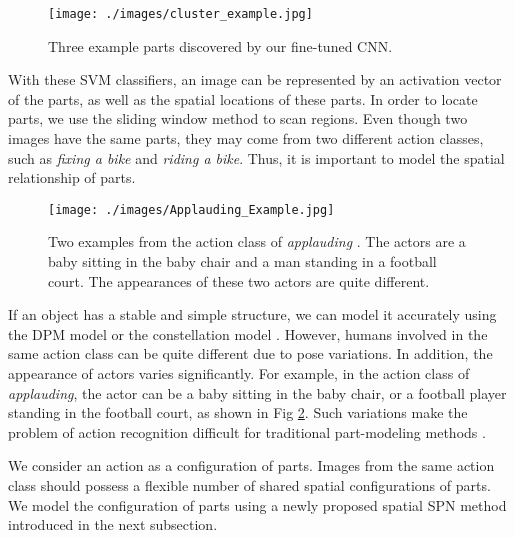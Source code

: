 \documentclass[journal]{IEEEtran}
\begin{document}
\begin{figure}[t]
	\begin{center}
		\texttt{[image: ./images/cluster\_example.jpg]}
	\end{center}
	\caption{Three example parts discovered by our fine-tuned CNN. }
	\label{fig:clusterExample}
\end{figure}


With these SVM classifiers, an image can be represented by an activation vector of the parts, as well as the spatial locations of these parts. In order to locate parts, we use the sliding window method to scan regions. Even though two images have the same parts, they may come from two different action classes,  such as \textit{fixing a bike} and \textit{riding a bike}. Thus, it is important to model the spatial relationship of parts.


\begin{figure}[htb]
	\begin{center}
		\texttt{[image: ./images/Applauding\_Example.jpg]}
	\end{center}
	\caption{Two examples from the action class of \textit{applauding} \cite{Yao11humanaction__Stanford40}. The actors are a baby sitting in the baby chair and a man standing in a football court. The appearances of these two actors are quite different.}
	\label{fig:ApplaudingExample}
\end{figure}

If an object has a stable and simple structure, we can model it accurately using the DPM model \cite{DPM_Felzenszwalb:2010:ODD:1850486.1850574} or the constellation model \cite{CONStellation_model}. However, humans involved in the same action class can be quite different due to pose variations. In addition, the appearance of actors varies significantly. For example, in the action class of \textit{applauding}, the actor can be a baby sitting in the baby chair, or a football player standing in the football court, as shown in Fig \ref{fig:ApplaudingExample}. Such variations make the problem of action recognition difficult for traditional part-modeling methods \cite{CONStellation_model,DPM_Felzenszwalb:2010:ODD:1850486.1850574}.


We consider an action as a configuration of parts. Images from the same action class should possess a flexible number of shared spatial configurations of parts. We model the configuration of parts using a newly proposed spatial SPN method introduced in the next subsection.
\end{document}
